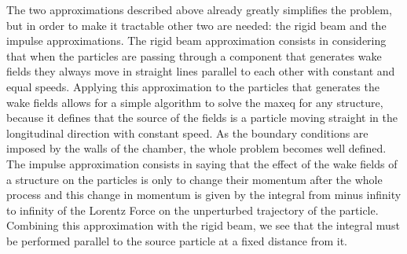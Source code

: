     The two approximations described above already greatly simplifies the problem, but in order to make it tractable other two are needed: the rigid beam and the impulse approximations. The rigid beam approximation consists in considering that when the particles are passing through a component that generates wake fields they always move in straight lines parallel to each other with constant and equal speeds. Applying this approximation to the particles that generates the wake fields allows for a simple algorithm to solve the \gls{maxeq} for any structure, because it defines that the source of the fields is a particle moving straight in the longitudinal direction with constant speed. As the boundary conditions are imposed by the walls of the chamber, the whole problem becomes well defined. The impulse approximation consists in saying that the effect of the wake fields of a structure on the particles is only to change their momentum after the whole process and this change in momentum is given by the integral from minus infinity to infinity of the Lorentz Force on the unperturbed trajectory of the particle. Combining this approximation with the rigid beam, we see that the integral must be performed parallel to the source particle at a fixed distance from it.

